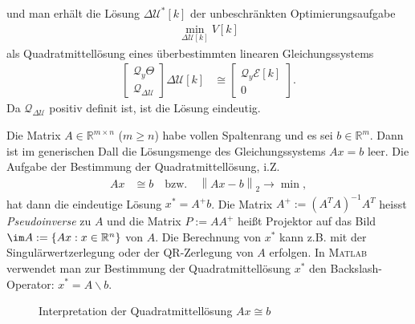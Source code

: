 und man erhält die Lösung $\Delta\mathcal{U}^{\ast}[k]$ der unbeschränkten Optimierungsaufgabe
\begin{align}
	\min\limits_{\Delta\mathcal{U}[k]}V[k]
\end{align}
als Quadratmittellösung eines überbestimmten linearen Gleichungssystems
\begin{align}
	\begin{bmatrix}
	\mathcal{Q}_y\Theta\\ \mathcal{Q}_{\Delta\mathcal{U}}
	\end{bmatrix}\Delta\mathcal{U}[k] & \cong \begin{bmatrix}
	\mathcal{Q}_y\mathcal{E}[k]\\ 0
	\end{bmatrix}. \label{eqn:kap_4_quadratmittelproblem}
\end{align}
Da $\mathcal{Q}_{\Delta\mathcal{U}}$ positiv definit ist, ist die Lösung eindeutig.
\begin{remark}
Die Matrix $A\in\mathbb{R}^{m\times n}$ ($m\ge n$) habe vollen Spaltenrang und es sei $b\in\mathbb{R}^m$. Dann ist im generischen Dall die Lösungsmenge des Gleichungssystems $A x= b$
leer. Die Aufgabe der Bestimmung der Quadratmittellösung, i.Z.
\begin{align}
	A x & \cong b\quad \text{bzw.}\quad \left\| A x -b \right\|_2\rightarrow \min,
\end{align}
hat dann die eindeutige Lösung $x^{\ast}=A^+b$. Die Matrix $A^+:=\left(A^TA\right)^{-1}A^T$ heisst \textit{Pseudoinverse} zu $A$ und die Matrix $P:=A A^+$ heißt Projektor auf das Bild
$\im A:=\left\{ A x : x\in\mathbb{R}^n \right\}$ von $A$. Die Berechnung von $x^{\ast}$ kann z.B. mit der Singulärwertzerlegung oder der QR-Zerlegung von $A$ erfolgen. In \textsc{Matlab}
verwendet man zur Bestimmung der Quadratmittellösung $x^{\ast}$ den Backslash-Operator: $x^{\ast}=A\backslash b$.
\end{remark} 
\begin{figure}[htb]
	\centering
	
	\caption{Interpretation der Quadratmittellösung $A x\cong b$}
	\label{fig:kap_4_interp_quadratmittelloesung}
\end{figure}
